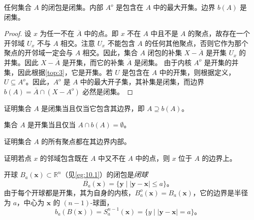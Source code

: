 \begin{theorem}\label{thm:10.2} 
	任何集合 $A$ 的闭包是闭集。内部 $A^{o}$ 是包含在 $A$ 中的最大开集。边界 $b(A)$ 是闭集。
\begin{theorem}

\begin{proof}
	设 $x$ 为任一不在 $\overline{A}$ 中的点。即 $x$ 不在 $A$ 中且不是 $A$ 的聚点，故存在一个开邻域 $U_{x}$ 不与 $A$ 相交。注意 $U_{x}$ 不能包含 $A$ 的任何其他聚点，否则它作为那个聚点的开邻域一定会与 $A$ 相交。因此，集合 $A$ 闭包的补集 $X-\overline{A}$ 是开集 $U_{x}$ 的并集。因此 $X-\overline{A}$ 是开集，而它的补集 $\overline{A}$ 是闭集。
	由于内核 $A^{o}$ 是开集的并集，因此根据\ref{top:3}，它是开集。若 $U$ 是包含在 $A$ 中的开集，则根据定义，$U\subseteq A^{o}$。因此，$A^{o}$ 是 $A$ 中的最大开子集，其补集是闭集，而边界 $b(A)=\overline{A} \cap \left( X-A^{o}\right)$ 必然是闭集。
\end{proof}

\begin{exercise}
	证明集合 $A$ 是闭集当且仅当它包含其边界，即 $A\supseteq b(A)$。
\end{exercise}

\begin{exercise}
	集合 $A$ 是开集当且仅当 $A\cap b(A)=\emptyset $。
\end{exercise}

\begin{exercise}
	证明集合 $A$ 的所有聚点都在其边界内部。
\end{exercise} 

\begin{exercise}
	证明若点 $x$ 的邻域包含既在 $A$ 中又不在 $A$ 中的点，则 $x$ 位于 $A$ 的边界上。
\end{exercise}

\begin{eg}\label{eg:10.5}
	开球 $B_{a} (\mathbf{x} )\subset \mathbb{R}^{n}$（见\ref{eg:10.1}）的闭包是\emph{闭球}
\begin{equation*}
    \overline{B_{a}} (\mathbf{x} )=\{\mathbf{y} \mid | \mathbf{y} -\mathbf{x}| \leq a\}。
\end{equation*}
由于每个开球都是开集，其为自身的内核，$B_{a}^{o} (\mathbf{x} )=B_{a} (\mathbf{x} )$，它的边界是半径为 $a$，中心为 $\mathbf{x}$ 的 $(n-1)$-球面，
\begin{equation*}
b_{a} (B(\mathbf{x} ))=S_{a}^{n-1} (\mathbf{x} )=\{y\mid | \mathbf{y} -\mathbf{x}| =a\}。
\end{equation*}
\end{eg}


\end{theorem}
\end{theorem}
